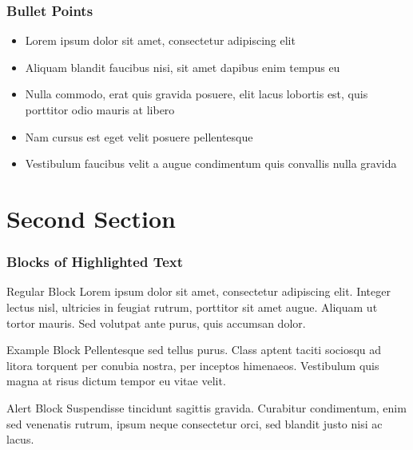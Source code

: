 \documentclass[aspectratio=169]{beamer}
\begin{document}

\begin{frame}
\frametitle{Bullet Points}
\begin{itemize}
\item Lorem ipsum dolor sit amet, consectetur adipiscing elit
\item Aliquam blandit faucibus nisi, sit amet dapibus enim tempus eu
\item Nulla commodo, erat quis gravida posuere, elit lacus lobortis est, quis porttitor odio mauris at libero
\item Nam cursus est eget velit posuere pellentesque
\item Vestibulum faucibus velit a augue condimentum quis convallis nulla gravida
\end{itemize}
\end{frame}

\section{Second Section} 

\begin{frame}
\frametitle{Blocks of Highlighted Text}
\begin{block}{Regular Block}
Lorem ipsum dolor sit amet, consectetur adipiscing elit. Integer lectus nisl, ultricies in feugiat rutrum, porttitor sit amet augue. Aliquam ut tortor mauris. Sed volutpat ante purus, quis accumsan dolor.
\end{block}

\begin{exampleblock}{Example Block}
Pellentesque sed tellus purus. Class aptent taciti sociosqu ad litora torquent per conubia nostra, per inceptos himenaeos. Vestibulum quis magna at risus dictum tempor eu vitae velit.
\end{exampleblock}

\begin{alertblock}{Alert Block}
Suspendisse tincidunt sagittis gravida. Curabitur condimentum, enim sed venenatis rutrum, ipsum neque consectetur orci, sed blandit justo nisi ac lacus.
\end{alertblock}
\end{frame}
\end{document}

